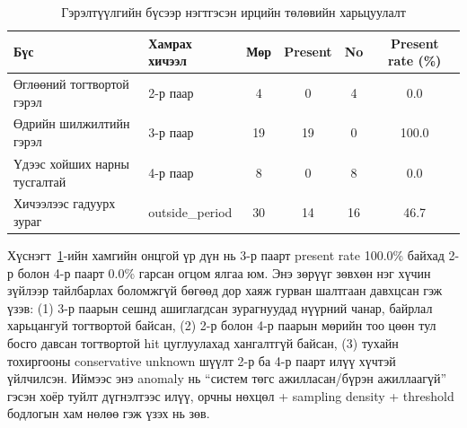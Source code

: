 \begin{table}[H]
	\centering
	\caption{Гэрэлтүүлгийн бүсээр нэгтгэсэн ирцийн төлөвийн харьцуулалт}
	\label{tab:lighting-zone-metrics}
	\begin{tabular}{|l|l|c|c|c|c|}
		\hline
		\textbf{Бүс} & \textbf{Хамрах хичээл} & \textbf{Мөр} & \textbf{Present} & \textbf{No} & \textbf{Present rate (\%)} \\
		\hline
		Өглөөний тогтвортой гэрэл & 2-р паар & 4 & 0 & 4 & 0.0 \\
		\hline
		Өдрийн шилжилтийн гэрэл & 3-р паар & 19 & 19 & 0 & 100.0 \\
		\hline
		Үдээс хойших нарны тусгалтай & 4-р паар & 8 & 0 & 8 & 0.0 \\
		\hline
		Хичээлээс гадуурх зураг & outside\_period & 30 & 14 & 16 & 46.7 \\
		\hline
	\end{tabular}
\end{table}

Хүснэгт~\ref{tab:lighting-zone-metrics}-ийн хамгийн онцгой үр дүн нь 3-р паарт present rate 100.0\% байхад 2-р болон 4-р паарт 0.0\% гарсан огцом ялгаа юм. Энэ зөрүүг зөвхөн нэг хүчин зүйлээр тайлбарлах боломжгүй бөгөөд дор хаяж гурван шалтгаан давхцсан гэж үзэв: (1) 3-р паарын сешнд ашиглагдсан зурагнуудад нүүрний чанар, байрлал харьцангуй тогтвортой байсан, (2) 2-р болон 4-р паарын мөрийн тоо цөөн тул босго давсан тогтвортой hit цуглуулахад хангалтгүй байсан, (3) тухайн тохиргооны conservative unknown шүүлт 2-р ба 4-р паарт илүү хүчтэй үйлчилсэн. Иймээс энэ anomaly нь ``систем төгс ажилласан/бүрэн ажиллаагүй'' гэсэн хоёр туйлт дүгнэлтээс илүү, орчны нөхцөл + sampling density + threshold бодлогын хам нөлөө гэж үзэх нь зөв.



